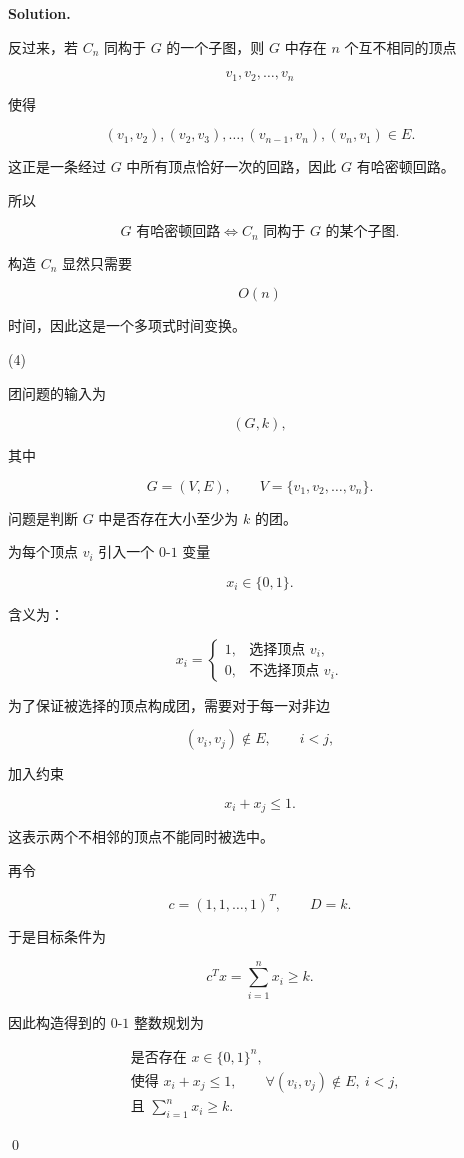 \documentclass[11pt]{article}
\newenvironment{solution}{
\par\noindent\textbf{Solution.}\par\noindent
}{\qed}
\begin{document}
\begin{solution}
反过来，若 $C_n$ 同构于 $G$ 的一个子图，则 $G$ 中存在 $n$ 个互不相同的顶点

\[
v_1,v_2,\ldots,v_n
\]

使得

\[
(v_1,v_2),(v_2,v_3),\ldots,(v_{n-1},v_n),(v_n,v_1)\in E.
\]

这正是一条经过 $G$ 中所有顶点恰好一次的回路，因此 $G$ 有哈密顿回路。

所以

\[
G \text{ 有哈密顿回路}
\iff
C_n \text{ 同构于 } G \text{ 的某个子图}.
\]

构造 $C_n$ 显然只需要

\[
O(n)
\]

时间，因此这是一个多项式时间变换。

(4)

团问题的输入为

\[
(G,k),
\]

其中

\[
G=(V,E),\qquad V=\{v_1,v_2,\ldots,v_n\}.
\]

问题是判断 $G$ 中是否存在大小至少为 $k$ 的团。

为每个顶点 $v_i$ 引入一个 $0$-$1$ 变量

\[
x_i\in\{0,1\}.
\]

含义为：

\[
x_i=
\begin{cases}
1, & \text{选择顶点 } v_i,\\
0, & \text{不选择顶点 } v_i.
\end{cases}
\]

为了保证被选择的顶点构成团，需要对于每一对非边

\[
(v_i,v_j)\notin E,\qquad i<j,
\]

加入约束

\[
x_i+x_j\leq 1.
\]

这表示两个不相邻的顶点不能同时被选中。

再令

\[
c=(1,1,\ldots,1)^T,
\qquad D=k.
\]

于是目标条件为

\[
c^Tx=\sum_{i=1}^n x_i\geq k.
\]

因此构造得到的 $0$-$1$ 整数规划为

\[
\begin{aligned}
&\text{是否存在 } x\in\{0,1\}^n,\\
&\text{使得 } x_i+x_j\leq 1,
\qquad \forall (v_i,v_j)\notin E,\ i<j,\\
&\text{且 } \sum_{i=1}^n x_i\geq k.
\end{aligned}
\]


\end{solution}
\end{document}

